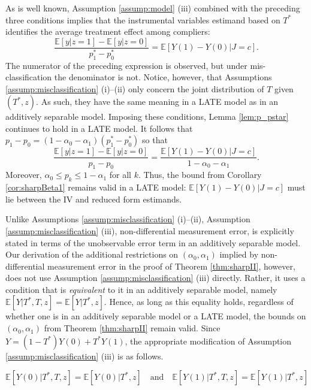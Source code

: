 As is well known, Assumption \ref{assump:model} (iii) combined with the preceding three conditions implies that the  instrumental variables estimand based on $T^*$ identifies the average treatment effect among compliers:
\[
  \frac{\mathbb{E}[y|z=1] - \mathbb{E}[y|z=0]}{p^*_1 - p^*_0} = \mathbb{E}[Y(1) - Y(0)|J=c].
\]
The numerator of the preceding expression is observed, but under mis-classification the denominator is not.
Notice, however, that Assumptions \ref{assump:misclassification} (i)--(ii) only concern the joint distribution of $T$ given $(T^*,z)$.
As such, they have the same meaning in a LATE model as in an additively separable model.
Imposing these conditions, Lemma \ref{lem:p_pstar} continues to hold in a LATE model.
It follows that $p_1 - p_0 = (1 - \alpha_0 - \alpha_1) (p_1^* - p_0^*)$ so that
\[
  \frac{\mathbb{E}[y|z=1] - \mathbb{E}[y|z=0]}{p_1 - p_0} = \frac{\mathbb{E}[Y(1) - Y(0)|J=c]}{1 - \alpha_0 - \alpha_1}.
\]
Moreover, $\alpha_0 \leq p_k \leq 1 - \alpha_1$ for all $k$.
Thus, the bound from Corollary \ref{cor:sharpBeta1} remains valid in a LATE model: $\mathbb{E}[Y(1) - Y(0)|J=c]$ must lie between the IV and reduced form estimands.

Unlike Assumptions \ref{assump:misclassification} (i)--(ii), Assumption \ref{assump:misclassification} (iii), non-differential measurement error, is explicitly stated in terms of the unobservable error term in an additively separable model.
Our derivation of the additional restrictions on $(\alpha_0, \alpha_1)$ implied by non-differential measurement error in the proof of Theorem \ref{thm:sharpII}, however, does not use Assumption \ref{assump:misclassification} (iii) directly.
Rather, it uses a condition that is \emph{equivalent} to it in an additively separable model, namely $\mathbb{E}[Y|T^*,T,z] = \mathbb{E}[Y|T^*,z]$.
Hence, as long as this equality holds, regardless of whether one is in an additively separable model or a LATE model, the bounds on $(\alpha_0, \alpha_1)$ from Theorem \ref{thm:sharpII} remain valid.
Since $Y = (1 - T^*)Y(0) + T^* Y(1)$, the appropriate modification of Assumption \ref{assump:misclassification} (iii) is as follows.
\begin{assump}
  \label{assump:LATEnondiff}
  \[
    \mathbb{E}[Y(0)|T^*,T,z] = \mathbb{E}[Y(0)|T^*,z] \quad \mbox{and} \quad \mathbb{E}[Y(1)|T^*,T,z] = \mathbb{E}[Y(1)|T^*,z]
  \]
\end{assump}

